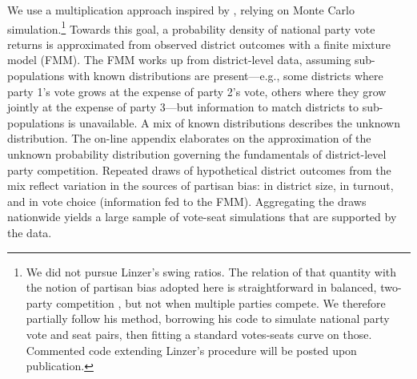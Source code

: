 \documentclass[letter,12pt]{article}
\begin{document}
We use a multiplication approach inspired by \citet{linzerSeatVoteElasticity2012}, relying on Monte Carlo simulation.\footnote{We did not pursue Linzer's swing ratios. The relation of that quantity with the notion of partisan bias adopted here is straightforward in balanced, two-party competition \citep[see][:410]{linzerSeatVoteElasticity2012}, but not when multiple parties compete. We therefore partially follow his method, borrowing his code to simulate national party vote and seat pairs, then fitting a standard votes-seats curve on those. Commented code extending Linzer's procedure will be posted upon publication.} Towards this goal, a probability density of national party vote returns is approximated from observed district outcomes with a finite mixture model (FMM). The FMM works up from district-level data, assuming sub-populations with known distributions are present---e.g., some districts where party 1's vote grows at the expense of party 2's vote, others where they grow jointly at the expense of party 3---but information to match districts to sub-populations is unavailable. A mix of known distributions describes the unknown distribution. The on-line appendix elaborates on the approximation of the unknown probability distribution governing the fundamentals of district-level party competition. Repeated draws of hypothetical district outcomes from the mix reflect variation in the sources of partisan bias: in district size, in turnout, and in vote choice (information fed to the FMM). Aggregating the draws nationwide yields a large sample of vote-seat simulations that are supported by the data.
\end{document}
